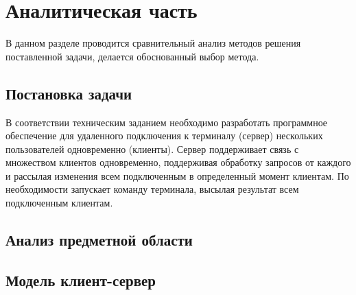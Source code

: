 \chapter{Аналитическая часть}

В данном разделе проводится сравнительный анализ методов решения
поставленной задачи, делается обоснованный выбор метода.

\section{Постановка задачи}

В соответствии техническим заданием необходимо разработать программное обеспечение для удаленного подключения к терминалу (сервер) нескольких пользователей одновременно (клиенты). Сервер поддерживает связь с множеством клиентов одновременно, поддерживая обработку запросов от каждого и рассылая изменения всем подключенным в определенный момент клиентам. По необходимости запускает команду терминала, высылая результат всем подключенным клиентам.

\section{Анализ предметной области}

\section{Модель клиент-сервер}

